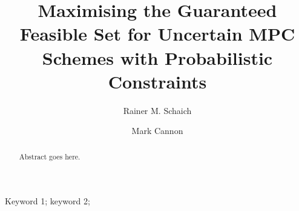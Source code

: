 \documentclass{ifacconf}
\begin{document}
\begin{frontmatter}

\title{Maximising the Guaranteed Feasible Set for Uncertain MPC Schemes with Probabilistic Constraints}%


\author{Rainer M. Schaich} 
\author{Mark Cannon}


\address{Department of Engineering Science, University of Oxford, OX1 3PJ, UK. (e-mail: \{rainer.schaich,mark.cannon\}@eng.ox.ac.uk).}


          
\begin{keyword}                           %
Keyword 1; keyword 2;
\end{keyword}                             %


\begin{abstract}                          %
Abstract goes here.
\end{abstract}

\end{frontmatter}
\end{document}
